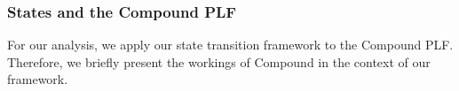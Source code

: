 








\subsubsection{States and the Compound PLF}
For our analysis, we apply our state transition framework to the Compound PLF.
Therefore, we briefly present the workings of Compound in the context of our framework.  

